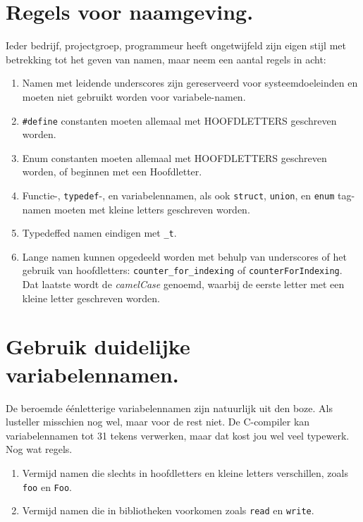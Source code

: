 \documentclass[12pt,a4paper,final,oneside,fleqn]{article}
\begin{document}
\section{Regels voor naamgeving.}
Ieder bedrijf, projectgroep, programmeur heeft ongetwijfeld zijn eigen stijl
met betrekking tot het geven van namen, maar neem een aantal regels in acht:

\begin{enumerate}[align=left,itemsep=0cm,leftmargin=*,label=\Roman*.]
\item Namen met leidende underscores zijn gereserveerd voor systeemdoeleinden
en moeten niet gebruikt worden voor variabele-namen.
\item \texttt{\#define} constanten moeten allemaal met HOOFDLETTERS geschreven
worden.
\item Enum constanten moeten allemaal met HOOFDLETTERS geschreven worden, of
beginnen met een Hoofdletter.
\item Functie-, \texttt{typedef}-, en variabelennamen, als ook \texttt{struct},
\texttt{union}, en \texttt{enum} tag-namen moeten met kleine letters geschreven worden.
\item Typedeffed namen eindigen met \texttt{\_t}.
\item Lange namen kunnen opgedeeld worden met behulp van underscores of het
gebruik van hoofdletters: \texttt{counter\_for\_indexing} of \texttt{counterForIndexing}.
Dat laatste wordt de \textit{camelCase} genoemd, waarbij de eerste
letter met een kleine letter geschreven worden.
\end{enumerate}


\section{Gebruik duidelijke variabelennamen.}
De beroemde \'{e}\'{e}nletterige variabelennamen zijn natuurlijk uit den boze.
Als lusteller misschien nog wel, maar voor de rest niet. De C-compiler kan
variabelennamen tot 31 tekens verwerken\cite{isocdraft2005}, maar dat kost jou wel
veel typewerk. Nog wat regels.

\begin{enumerate}[align=left,itemsep=0cm,leftmargin=*,label=\Roman*.]
\item Vermijd namen die slechts in hoofdletters en kleine letters verschillen,
  zoals \texttt{foo} en \texttt{Foo}.
\item Vermijd namen die in bibliotheken voorkomen zoals \texttt{read} en \texttt{write}.
\end{enumerate}
\end{document}
